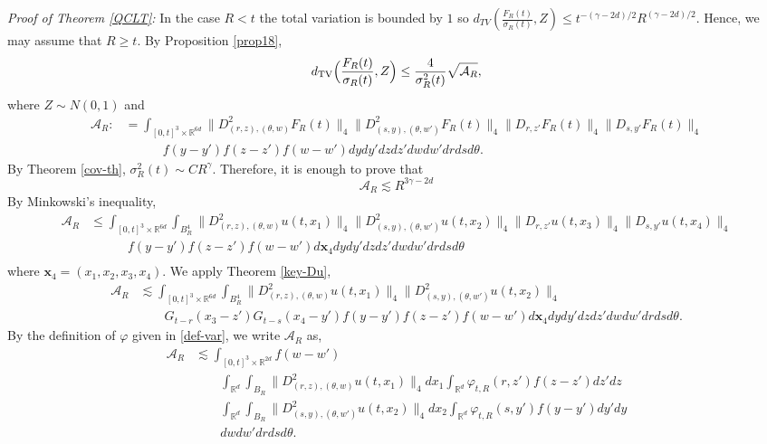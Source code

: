 \documentclass[12pt]{article}
\def\cA{\mathcal{A}}
\def\bR{\mathbb{R}}
\newcommand{\les}{\lesssim}
\begin{document}
{\em Proof of Theorem \ref{QCLT}:} In the case $R < t$ the total variation is bounded by $1$ so $d_{TV}\left(\frac{F_R(t)}{\sigma_R(t)},Z\right) \leq t^{-(\gamma-2d)/2}R^{(\gamma-2d)/2}$. Hence, we may assume that $R \geq t$. By Proposition \ref{prop18},
\[
d_{\rm TV}\Big( \frac{F_R(t)}{\sigma_R(t)},  Z\Big) \leq \frac{4}{\sigma_R^2(t)} \sqrt{\mathcal{A}_R},
\]
where $Z\sim N(0,1)$ and
\begin{align*}
\mathcal{A}_R:&= \int_{[0,t]^3 \times\bR^{6d}}  \| D_{(r,z),(\theta,w)}^2 F_R(t) \|_4  \| D_{(s,y),(\theta,w')}^2 F_R(t)\|_4  \| D_{r,z'}F_R(t)\|_4 \| D_{s, y' }F_R(t) \|_4  \\
&\quad  \quad \quad f(y-y') f(z-z') f(w-w') dydy'dzdz' dwdw'  dr ds d\theta.
\end{align*}
By Theorem \ref{cov-th}, $\sigma_R^2(t)\sim C R^{\gamma}$. Therefore, it is enough to prove that 
\begin{equation}
\label{bound-AR}
\cA_R \les R^{3\gamma-2d}
\end{equation}
By Minkowski's inequality,
\begin{align*}
\mathcal{A}_R & \leq  \int_{[0,t]^3 \times\bR^{6d}} \int_{B_R^4} \| D_{(r,z),(\theta,w)}^2 u(t,x_1) \|_4  \| D_{(s,y),(\theta,w')}^2 u(t,x_2)\|_4  \| D_{r,z'}u(t,x_3)\|_4 \| D_{s, y' }u(t,x_4) \|_4  \\
&\quad  \quad \quad f(y-y') f(z-z') f(w-w') d\pmb{x}_4 dydy'dzdz' dwdw'  dr ds d\theta \\
\end{align*}
where $\pmb{x}_4=(x_1,x_2,x_3,x_4)$. We apply Theorem \ref{key-Du},
\begin{align*}
\cA_{R} & \les \int_{[0,t]^3 \times\bR^{6d}} \int_{B_R^4} \| D_{(r,z),(\theta,w)}^2 u(t,x_1) \|_4  \| D_{(s,y),(\theta,w')}^2 u(t,x_2)\|_4 \\
& \quad  \quad G_{t-r}(x_3-z') G_{t-s}(x_4-y') f(y-y') f(z-z') f(w-w') d\pmb{x}_4 dydy'dzdz' dwdw'  dr ds d\theta.
\end{align*}
By the definition of $\varphi$ given in \eqref{def-var}, we write $\cA_{R}$ as, 
\begin{align*}
\cA_{R} & \les \int_{[0,t]^3 \times\bR^{2d}} f(w-w')  \\
& \qquad \int_{\bR^d} \int_{B_R}\| D_{(r,z),(\theta,w)}^2 u(t,x_1) \|_4 dx_1 \int_{\bR^d} \varphi_{t,R}(r,z') f(z-z') dz' dz \\
& \qquad \int_{\bR^d} \int_{B_R} \| D_{(s,y),(\theta,w')}^2 u(t,x_2)\|_4  dx_2 \int_{\bR^d} \varphi_{t,R}(s,y') f(y-y') dy' dy \\
& \qquad  dwdw'  dr ds d\theta.
\end{align*}
\end{document}
